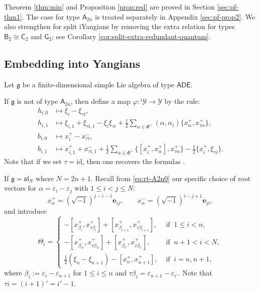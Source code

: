 \documentclass[11pt,reqno]{amsart}
\numberwithin{equation}{section}
\theoremstyle{definition}
\theoremstyle{remark}
\newcommand{\beq}{\begin{equation}}
\newcommand{\eeq}{\end{equation}}
\newcommand{\be}{\begin{equation*}}
\newcommand{\ee}{\end{equation*}}
\newcommand{\hf}{\tfrac12}
\newcommand{\g}{\mathfrak{g}}
\newcommand{\lle}{\leqslant}
\newcommand{\ve}{\varepsilon}
\newcommand{\Y}{{\mathscr{Y}}}
\newcommand{\Yi}{{^\imath\mathscr{Y}}}
\begin{document}
Theorem \ref{thm:min} and Proposition \ref{prop:red} are proved in Section \ref{sec:pf-thm1}. The case for type $\mathsf A_{2n}$ is treated separately in Appendix \ref{sec:pf-prop2}. We also strengthen \cite[Theorem~3.1]{Lu26min} for split iYangians by removing the extra relation for types $\mathsf B_2\cong\mathsf C_2$ and $\mathsf G_2$; see Corollary \ref{cor:split-extra-redundant-quantum}.

\subsection{Embedding into Yangians}
Let $\g$ be a finite-dimensional simple Lie algebra of type $\mathsf{ADE}$.

If $\g$ is not of type $\mathsf A_{2n}$, then define a map $\varphi:\Yi\to \Y$ by the rule:
\begin{align}
	h_{i,0}&\mapsto \xi_{i}-\xi_{\tau i},\label{hi0-embedding}\\
    h_{i,1}&\mapsto \xi_{i,1}+\xi_{\tau i,1}-\xi_{i}\xi_{\tau i}+\hf\sum_{\alpha\in\Phi^+}(\alpha,\alpha_i)\{x_\alpha^+,x_{\tau \alpha}^+\},\label{hi1-embedding}\\
    b_{i,0}&\mapsto x_{i}^+-x_{\tau i}^-,\label{bi0-embedding}\\
    b_{i,1}&\mapsto x_{i,1}^++x_{\tau i,1}^-+\tfrac12\sum_{\alpha\in\Phi^+}\big\{[x_{i}^+,x_{\alpha}^+],x_{\tau\alpha}^+\big\}-\tfrac12\{x_i^+,\xi_{\tau i}\}.\label{bi1-embedding}
\end{align}
Note that if we set $\tau =\mathrm{id}$, then one recovers the formulas \cite[(4.1)--(4.3)]{Lu26min}.

If $\g=\mathfrak{sl}_{N}$ where $N=2n+1$. Recall from \eqref{eq:rt-A2n0} our specific choice of root vectors for $\alpha=\ve_i-\ve_j$ with $1\lle i<j\lle N$:
\be
x_\alpha^+=(\sqrt{-1})^{j-i-1}\mathbf e_{ij},\qquad x_\alpha^-=(\sqrt{-1})^{i-j+1}\mathbf e_{ji},
\ee
and introduce
\beq\label{eq:Theta}
    \Theta_i=\begin{cases}
    -[x_{\beta_i}^+,x_{\tau\beta_i}^+]+[x_{\beta_{i+1}}^+,x_{\tau\beta_{i+1}}^+],&\text{ if }~1\lle i<n,\\
    -[x_{\beta_{\tau i}}^+,x_{\tau\beta_{\tau i}}^+]+[x_{\beta_{i'}}^+,x_{\tau\beta_{i'}}^+],&\text{ if }~n+1<i<N,\\
    \tfrac12(\xi_n-\xi_{n+1})-[x_n^+,x_{n+1}^+],&\text{ if }~i=n,n+1,
    \end{cases}
\eeq
where $\beta_i:=\ve_i-\ve_{n+1}$ for $1\lle i\lle n$ and $\tau\beta_i=\ve_{n+1}-\ve_{i'}$. Note that $\tau i=(i+1)'=i'-1$.
\end{document}
